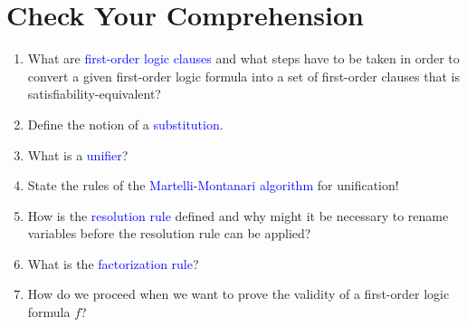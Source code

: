 \section{Check Your Comprehension}
\begin{enumerate}
\item What are \textcolor{blue}{first-order logic clauses} and what steps have to be taken in order to convert
      a given first-order logic formula into a set of first-order clauses that is satisfiability-equivalent?
\item Define the notion of a \textcolor{blue}{substitution}.
\item What is a \textcolor{blue}{unifier}?
\item State the rules of the \textcolor{blue}{Martelli-Montanari algorithm} for unification!
\item How is the \textcolor{blue}{resolution rule} defined and why might it be necessary to rename variables
      before the resolution rule can be applied?
\item What is the \textcolor{blue}{factorization rule}?
\item How do we proceed when we want to prove the validity of a first-order logic formula $f$?
\end{enumerate}


